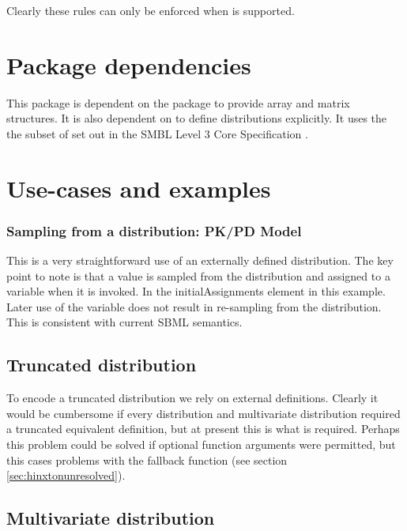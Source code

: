 \documentclass[draftspec]{sbmlpkgspec}
\begin{document}
Clearly these rules can only be enforced when \distrib is supported.

\section{Package dependencies}

This package is dependent on the \arrays package to provide array and
matrix structures. It is also dependent on \mathml \cite{mathml2} to
define distributions explicitly. It uses the the subset of \mathml set
out in the SMBL Level 3 Core Specification
\cite{l3v1c}.

\section{Use-cases and examples}

\subsubsection{Sampling from a distribution: PK/PD Model}

This is a very straightforward use of an externally defined
distribution. The key point to note is that a value is sampled from
the distribution and assigned to a variable when it is invoked. In the
initialAssignments element in this example. Later use of the variable
does not result in re-sampling from the distribution. This is
consistent with current SBML semantics.


\subsection{Truncated distribution}
\label{sec: truncated-eg}

To encode a truncated distribution we rely on external
definitions. Clearly it would be cumbersome if every distribution and
multivariate distribution required a truncated equivalent definition,
but at present this is what is required\contraversial. Perhaps this
problem could be solved if optional function arguments were permitted,
but this cases problems with the fallback function (see section \ref{sec:hinxtonunresolved}).


\subsection{Multivariate distribution}
\end{document}
